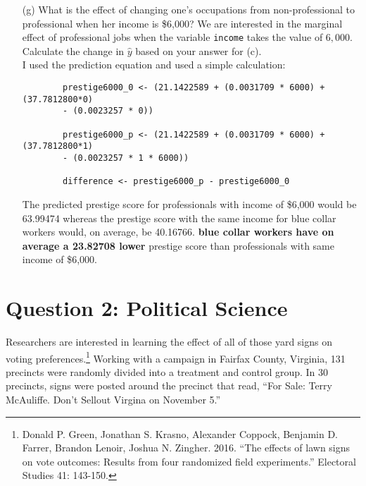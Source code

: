 \documentclass[12pt,letterpaper]{article}
\begin{document}
\begin{enumerate}
I used the prediction equation and used a simple calculation:

\begin{verbatim}
prestige1000 <- (21.1422589 + (0.0031709 * 1000) + (37.7812800*1)
- (0.0023257 * 1 * 1000))
print(prestige1000)  
\end{verbatim}

A \$1,000 income increase for professionals would on average result in \textbf{59.76874} for $\hat{Y}$ prestige score.
	
	\vspace{.5cm}
	
\newpage

	
	\item [(g)]
	What is the effect of changing one's occupations from non-professional to professional when her income is \$6,000? We are interested in the marginal effect of professional jobs when the variable \texttt{income} takes the value of $6,000$. Calculate the change in $\hat{y}$ based on your answer for (c).\\
	
	I used the prediction equation and used a simple calculation:
	\begin{verbatim}
		prestige6000_0 <- (21.1422589 + (0.0031709 * 6000) + (37.7812800*0)                    
		- (0.0023257 * 0))

		prestige6000_p <- (21.1422589 + (0.0031709 * 6000) + (37.7812800*1)                       
		- (0.0023257 * 1 * 6000))
		
		difference <- prestige6000_p - prestige6000_0
	\end{verbatim}

The predicted prestige score for professionals with income of \$6,000 would be 63.99474 whereas the prestige score with the same income for blue collar workers would, on average, be 40.16766.
\textbf{blue collar workers have on average a 23.82708 lower} prestige score than professionals with same income of \$6,000.
	
\end{enumerate}

\newpage

\section*{Question 2: Political Science}
\vspace{.25cm}
\noindent 	Researchers are interested in learning the effect of all of those yard signs on voting preferences.\footnote{Donald P. Green, Jonathan	S. Krasno, Alexander Coppock, Benjamin D. Farrer,	Brandon Lenoir, Joshua N. Zingher. 2016. ``The effects of lawn signs on vote outcomes: Results from four randomized field experiments.'' Electoral Studies 41: 143-150. } Working with a campaign in Fairfax County, Virginia, 131 precincts were randomly divided into a treatment and control group. In 30 precincts, signs were posted around the precinct that read, ``For Sale: Terry McAuliffe. Don't Sellout Virgina on November 5.'' \\
\end{document}
